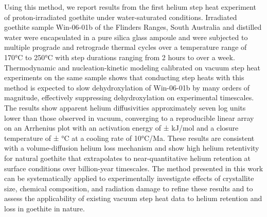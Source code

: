 Using this method, we report
results from the first helium step heat experiment of proton-irradiated
goethite under water-saturated conditions. Irradiated goethite sample
Win-06-01b of the Flinders Ranges, South Australia and distilled
water were encapsulated in a pure silica glass ampoule and were
subjected to multiple prograde and retrograde thermal cycles over a
temperature range of 170°C to 250°C with step durations ranging from 2 hours to over a week. Thermodynamic and 
nucleation-kinetic modeling calibrated on vacuum step heat experiments on the same sample 
shows that conducting step heats with this method is expected to
slow dehydroxylation of Win-06-01b by many orders of magnitude, effectively suppressing dehydroxylation on 
experimental timescales. The results show apparent helium diffusivities approximately
seven log units lower than those observed in vacuum, converging to 
a reproducible linear array on an Arrhenius plot with an activation energy of \ChTwoEa
± \ChTwoEaErr kJ/mol and a closure temperature of \ChTwoTc ± \ChTwoTcErr °C at a cooling rate of 10°C/Ma.
These results are consistent with a volume-diffusion helium loss
mechanism and show high helium retentivity for natural goethite 
that extrapolates to near-quantitative helium retention at
surface conditions over billion-year timescales. The method
presented in this work can be systematically applied to experimentally
investigate effects of crystallite size, chemical composition, and
radiation damage to refine these results and to assess the applicability
of existing vacuum step heat data to helium retention and loss in
goethite in nature.